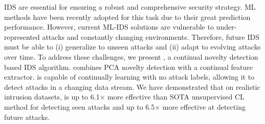 IDS are essential for ensuring a robust and comprehensive security strategy. ML methods have been recently adopted for this task due to their great prediction performance. However, current ML-IDS solutions are vulnerable to under-represented attacks and constantly changing environments. Therefore, future IDS must be able to (i) generalize to unseen attacks and (ii) adapt to evolving attacks over time. To address these challenges, we present \Design{}, a continual novelty detection based IDS algorithm. \Design{} combines PCA novelty detection with a continual feature extractor. \Design{} is capable of continually learning with no attack labels, allowing it to detect attacks in a changing data stream. We have demonstrated that on realistic intrusion datasets, \Design{} is up to 6.1$\times$ more effective than SOTA unsupervised CL method for detecting seen attacks and up to 6.5$\times$ more effective at detecting future attacks. %